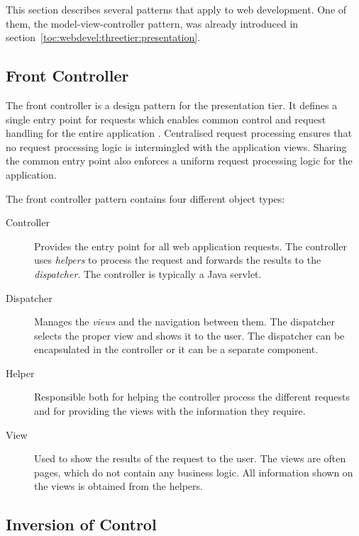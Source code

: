 This section describes several patterns that apply to web development. 
One of them, the model-view-controller pattern, was already introduced 
in section~\ref{toc:webdevel:threetier:presentation}.



\subsection{Front Controller}
\label{toc:webdevel:patterns:front}

The front controller is a design pattern for the presentation tier. It 
defines a single entry point for requests which enables common control 
and request handling for the entire application \citep{patternj2ee, 
corej2eepat}. Centralised request processing ensures that no request 
processing logic is intermingled with the application views. Sharing 
the common entry point also enforces a uniform request processing 
logic for the application.

The front controller pattern contains four different object types:
\begin{description}
  \item[Controller] Provides the entry point for all web application 
  requests. The controller uses \textsl{helpers} to process the 
  request and forwards the results to the \textsl{dispatcher}. The 
  controller is typically a Java servlet.

  \item[Dispatcher] Manages the \textsl{views} and the navigation 
  between them. The dispatcher selects the proper view and shows it to 
  the user. The dispatcher can be encapsulated in the controller or it 
  can be a separate component.

  \item[Helper] Responsible both for helping the controller process 
  the different requests and for providing the views with the 
  information they require.

  \item[View] Used to show the results of the request to the user. The 
  views are often  pages, which do not contain any 
  business logic. All information shown on the views is obtained from 
  the helpers.
\end{description}


\subsection{Inversion of Control}
\label{toc:webdevel:patterns:ioc}

